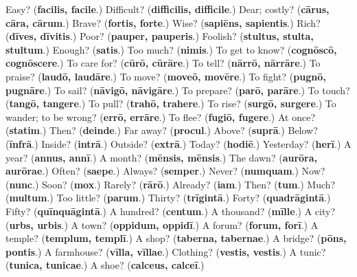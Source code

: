 \begin{tcolorbox}[breakable,colback=teal!4,colframe=teal!35!black,title={Before you move on}]
Easy? (\textbf{facilis, facile}.) Difficult? (\textbf{difficilis, difficile}.) Dear; costly? (\textbf{cārus, cāra, cārum}.) Brave? (\textbf{fortis, forte}.) Wise? (\textbf{sapiēns, sapientis}.) Rich? (\textbf{dīves, dīvitis}.) Poor? (\textbf{pauper, pauperis}.) Foolish? (\textbf{stultus, stulta, stultum}.) Enough? (\textbf{satis}.) Too much? (\textbf{nimis}.) To get to know? (\textbf{cognōscō, cognōscere}.) To care for? (\textbf{cūrō, cūrāre}.) To tell? (\textbf{nārrō, nārrāre}.) To praise? (\textbf{laudō, laudāre}.) To move? (\textbf{moveō, movēre}.) To fight? (\textbf{pugnō, pugnāre}.) To sail? (\textbf{nāvigō, nāvigāre}.) To prepare? (\textbf{parō, parāre}.) To touch? (\textbf{tangō, tangere}.) To pull? (\textbf{trahō, trahere}.) To rise? (\textbf{surgō, surgere}.) To wander; to be wrong? (\textbf{errō, errāre}.) To flee? (\textbf{fugiō, fugere}.) At once? (\textbf{statim}.) Then? (\textbf{deinde}.) Far away? (\textbf{procul}.) Above? (\textbf{suprā}.) Below? (\textbf{īnfrā}.) Inside? (\textbf{intrā}.) Outside? (\textbf{extrā}.) Today? (\textbf{hodiē}.) Yesterday? (\textbf{herī}.) A year? (\textbf{annus, annī}.) A month? (\textbf{mēnsis, mēnsis}.) The dawn? (\textbf{aurōra, aurōrae}.) Often? (\textbf{saepe}.) Always? (\textbf{semper}.) Never? (\textbf{numquam}.) Now? (\textbf{nunc}.) Soon? (\textbf{mox}.) Rarely? (\textbf{rārō}.) Already? (\textbf{iam}.) Then? (\textbf{tum}.) Much? (\textbf{multum}.) Too little? (\textbf{parum}.) Thirty? (\textbf{trīgintā}.) Forty? (\textbf{quadrāgintā}.) Fifty? (\textbf{quīnquāgintā}.) A hundred? (\textbf{centum}.) A thousand? (\textbf{mīlle}.) A city? (\textbf{urbs, urbis}.) A town? (\textbf{oppidum, oppidī}.) A forum? (\textbf{forum, forī}.) A temple? (\textbf{templum, templī}.) A shop? (\textbf{taberna, tabernae}.) A bridge? (\textbf{pōns, pontis}.) A farmhouse? (\textbf{vīlla, vīllae}.) Clothing? (\textbf{vestis, vestis}.) A tunic? (\textbf{tunica, tunicae}.) A shoe? (\textbf{calceus, calceī}.)
\end{tcolorbox}
